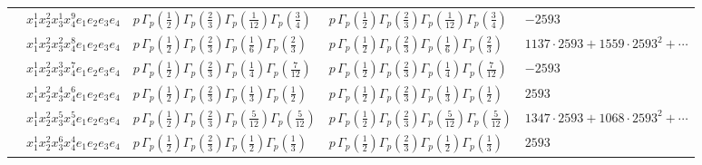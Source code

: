 \documentclass[11pt]{article}
\begin{document}
\begin{table}[ht]
{\begin{tabular}{@{}lllll@{}}
 & $x_{1}^{1} x_{2}^{2} x_{3}^{1} x_{4}^{9}  e_{1} e_{2} e_{3} e_{4}$ & $p \, \Gamma_p \left( \frac{1}{2} \right) \Gamma_p \left( \frac{2}{3} \right) \Gamma_p \left( \frac{1}{12} \right) \Gamma_p \left( \frac{3}{4} \right)$ & $p \, \Gamma_p \left( \frac{1}{2} \right) \Gamma_p \left( \frac{2}{3} \right) \Gamma_p \left( \frac{1}{12} \right) \Gamma_p \left( \frac{3}{4} \right)$ & $-2593$ \\
 & $x_{1}^{1} x_{2}^{2} x_{3}^{2} x_{4}^{8}  e_{1} e_{2} e_{3} e_{4}$ & $p \, \Gamma_p \left( \frac{1}{2} \right) \Gamma_p \left( \frac{2}{3} \right) \Gamma_p \left( \frac{1}{6} \right) \Gamma_p \left( \frac{2}{3} \right)$ & $p \, \Gamma_p \left( \frac{1}{2} \right) \Gamma_p \left( \frac{2}{3} \right) \Gamma_p \left( \frac{1}{6} \right) \Gamma_p \left( \frac{2}{3} \right)$ & $1137{\cdot}2593{+}1559{\cdot}2593^{2}{+}\cdots$ \\
 & $x_{1}^{1} x_{2}^{2} x_{3}^{3} x_{4}^{7}  e_{1} e_{2} e_{3} e_{4}$ & $p \, \Gamma_p \left( \frac{1}{2} \right) \Gamma_p \left( \frac{2}{3} \right) \Gamma_p \left( \frac{1}{4} \right) \Gamma_p \left( \frac{7}{12} \right)$ & $p \, \Gamma_p \left( \frac{1}{2} \right) \Gamma_p \left( \frac{2}{3} \right) \Gamma_p \left( \frac{1}{4} \right) \Gamma_p \left( \frac{7}{12} \right)$ & $-2593$ \\
 & $x_{1}^{1} x_{2}^{2} x_{3}^{4} x_{4}^{6}  e_{1} e_{2} e_{3} e_{4}$ & $p \, \Gamma_p \left( \frac{1}{2} \right) \Gamma_p \left( \frac{2}{3} \right) \Gamma_p \left( \frac{1}{3} \right) \Gamma_p \left( \frac{1}{2} \right)$ & $p \, \Gamma_p \left( \frac{1}{2} \right) \Gamma_p \left( \frac{2}{3} \right) \Gamma_p \left( \frac{1}{3} \right) \Gamma_p \left( \frac{1}{2} \right)$ & $2593$ \\
 & $x_{1}^{1} x_{2}^{2} x_{3}^{5} x_{4}^{5}  e_{1} e_{2} e_{3} e_{4}$ & $p \, \Gamma_p \left( \frac{1}{2} \right) \Gamma_p \left( \frac{2}{3} \right) \Gamma_p \left( \frac{5}{12} \right) \Gamma_p \left( \frac{5}{12} \right)$ & $p \, \Gamma_p \left( \frac{1}{2} \right) \Gamma_p \left( \frac{2}{3} \right) \Gamma_p \left( \frac{5}{12} \right) \Gamma_p \left( \frac{5}{12} \right)$ & $1347{\cdot}2593{+}1068{\cdot}2593^{2}{+}\cdots$ \\
 & $x_{1}^{1} x_{2}^{2} x_{3}^{6} x_{4}^{4}  e_{1} e_{2} e_{3} e_{4}$ & $p \, \Gamma_p \left( \frac{1}{2} \right) \Gamma_p \left( \frac{2}{3} \right) \Gamma_p \left( \frac{1}{2} \right) \Gamma_p \left( \frac{1}{3} \right)$ & $p \, \Gamma_p \left( \frac{1}{2} \right) \Gamma_p \left( \frac{2}{3} \right) \Gamma_p \left( \frac{1}{2} \right) \Gamma_p \left( \frac{1}{3} \right)$ & $2593$ \\

\end{tabular}}
\end{table}
\end{document}
